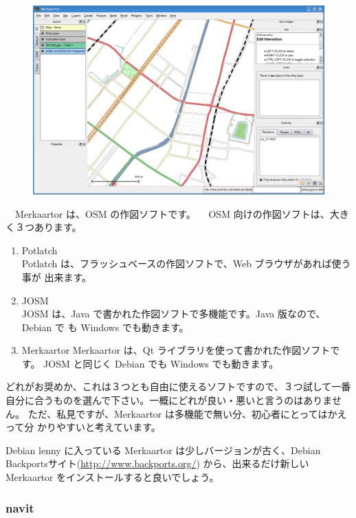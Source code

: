 \documentclass[mingoth,a4paper]{jsarticle}
\begin{document}
\begin{figure}
 \includegraphics[scale=0.28]{image200912/debianosm7.png}
\end{figure}

　Merkaartor は、OSM の作図ソフトです。
　OSM 向けの作図ソフトは、大きく３つあります。

\begin{enumerate}
 \item Potlatch \\
Potlatch は、フラッシュベースの作図ソフトで、Web ブラウザがあれば使う事が
出来ます。
 \item JOSM \\
JOSM は、Java で書かれた作図ソフトで多機能です。Java 版なので、Debian で
も Windows でも動きます。
 \item Merkaartor
Merkaartor は、Qt ライブラリを使って書かれた作図ソフトです。
JOSM と同じく Debian でも Windows でも動きます。
\end{enumerate}

どれがお奨めか、これは３つとも自由に使えるソフトですので、３つ試して一番
自分に合うものを選んで下さい。一概にどれが良い・悪いと言うのはありません。
ただ、私見ですが、Merkaartor は多機能で無い分、初心者にとってはかえって分
かりやすいと考えています。

Debian lenny に入っている Merkaartor は少しバージョンが古く、Debian
Backportsサイト(\url{http://www.backports.org/}) から、出来るだけ新しい
Merkaartor をインストールすると良いでしょう。

\subsubsection{navit}
\end{document}
